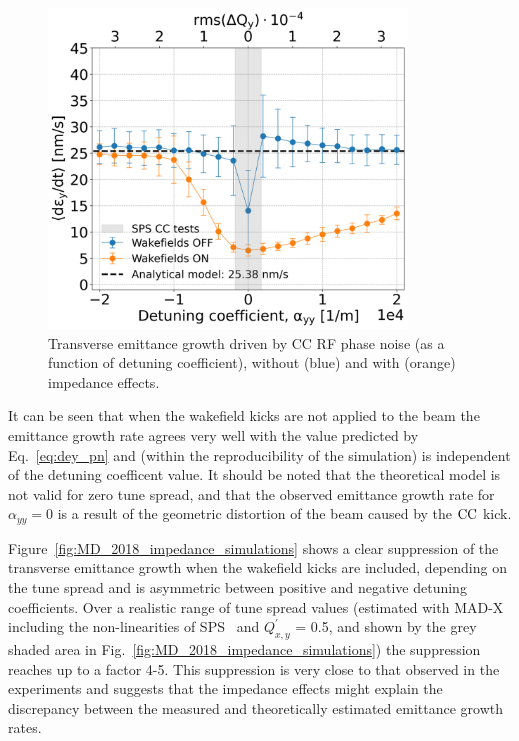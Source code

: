 \begin{figure}[!h] %
    \centering         
    \includegraphics[width=0.85\textwidth]{images/Ch7/deyRates_final_2018_PN_sps_270GeV_PN1e-8_400MHz_y-plane_QpxQpy5e-1_6D_Nb5e5_intensity3e10_ayyScan_wakesON_vs_OFF_vs_TuneSpreadvsExpectedSPS.png}
        \caption{Transverse emittance growth driven by CC RF phase noise (as a function of detuning coefficient), without (blue) and with (orange) impedance effects.}
        \label{fig:MD_2018_impedance_simulations_amplitude_detuning}
 \end{figure}

It can be seen that when the wakefield kicks are not applied to the beam the emittance growth rate agrees very well with the value predicted by Eq.~\eqref{eq:dey_pn} and (within the reproducibility of the simulation) is independent of the detuning coefficent value. It should be noted that the theoretical model is not valid for zero tune spread, and that the observed emittance growth rate for $\alpha_{yy} = 0$ is a result of the geometric distortion of the beam caused by the ${\mathrm{CC}}$ kick.

Figure~\ref{fig:MD_2018_impedance_simulations} shows a clear suppression of the transverse emittance growth when the wakefield kicks are included, depending on the tune spread and is asymmetric between positive and negative detuning coefficients. Over a realistic range of tune spread values (estimated with MAD-X~\cite{madx} including the non-linearities of SPS~\cite{Carlà:2664976, Alekou:2640326} and $Q^\prime_{x,y}$ = 0.5, and shown by the grey shaded area in Fig.~\ref{fig:MD_2018_impedance_simulations}) the suppression reaches up to a factor 4-5. This suppression is very close to that observed in the experiments and suggests that the impedance effects might explain the discrepancy between the measured and theoretically estimated emittance growth rates.


